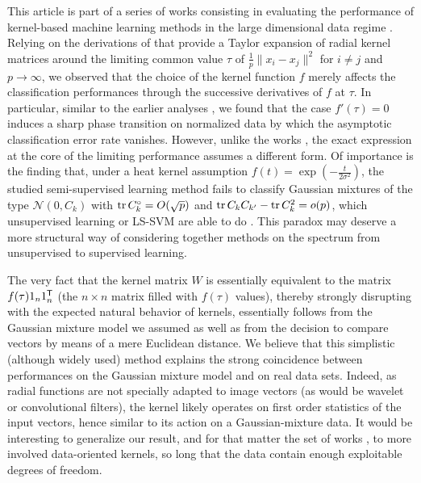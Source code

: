 \documentclass[twoside,11pt]{article}
\def\trans{{\sf T}}
\DeclareMathOperator{\tr}{{\rm tr}}
\begin{document}
This article is part of a series of works consisting in evaluating the performance of kernel-based machine learning methods in the large dimensional data regime \citep{couillet2015kernel,liao2017large,couillet2016random}. Relying on the derivations of \citet{couillet2015kernel} that provide a Taylor expansion of radial kernel matrices around the limiting common value $\tau$ of $\frac1p\|x_i-x_j\|^2$ for $i\neq j$ and $p\to\infty$, we observed that the choice of the kernel function $f$ merely affects the classification performances through the successive derivatives of $f$ at $\tau$. In particular, similar to the earlier analyses \citep{couillet2015kernel,liao2017large,couillet2016random}, we found that the case $f'(\tau)=0$ induces a sharp phase transition on normalized data by which the asymptotic classification error rate vanishes. However, unlike the works \citep{couillet2015kernel,liao2017large}, the exact expression at the core of the limiting performance assumes a different form. Of importance is the finding that, under a heat kernel assumption $f(t)=\exp(-\frac{t}{2\sigma^2})$, the studied semi-supervised learning method fails to classify Gaussian mixtures of the type $\mathcal N(0,C_k)$ with $\tr C_k^\circ=O(\sqrt{p})$ and $\tr C_kC_{k'}-\tr C_k^2=o(p)$, which unsupervised learning or LS-SVM are able to do \citep{couillet2015kernel,liao2017large}. This paradox may deserve a more structural way of considering together methods on the spectrum from unsupervised to supervised learning. 

\medskip

The very fact that the kernel matrix $W$ is essentially equivalent to the matrix $f(\tau)1_n1_n^\trans$ (the $n\times n$ matrix filled with $f(\tau)$ values), thereby strongly disrupting with the expected natural behavior of kernels, essentially follows from the Gaussian mixture model we assumed as well as from the decision to compare vectors by means of a mere Euclidean distance. We believe that this simplistic (although widely used) method explains the strong coincidence between performances on the Gaussian mixture model and on real data sets. Indeed, as radial functions are not specially adapted to image vectors (as would be wavelet or convolutional filters), the kernel likely operates on first order statistics of the input vectors, hence similar to its action on a Gaussian-mixture data. It would be interesting to generalize our result, and for that matter the set of works \citep{couillet2015kernel,liao2017large,couillet2016random}, to more involved data-oriented kernels, so long that the data contain enough exploitable degrees of freedom.
\end{document}
